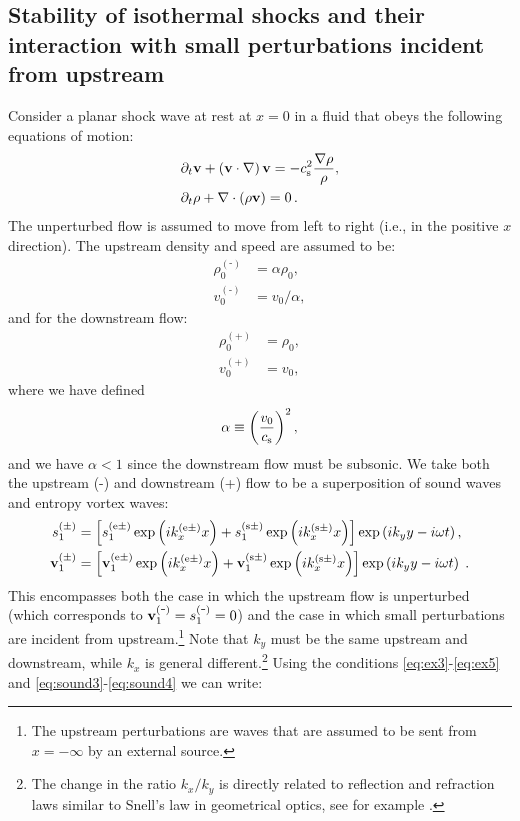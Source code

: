 \documentclass[useAMS,usenatbib]{mn2e}
\def\Plus{\texttt{+}}
\def\Minus{\texttt{-}}
\def\pa{\partial}
\begin{document}
\subsection{Stability of isothermal shocks and their interaction with small perturbations incident from upstream}
Consider a planar shock wave at rest at $x=0$ in a fluid that obeys the following equations of motion:
%
\begin{align} 
	& \pa_t \bfv + \left( \bfv \cdot \nabla \right) \bfv  = - \cs^2 \frac{\nabla \rho}{\rho} \label{eq:eomdk1}, \\ 
	& \pa_t \rho + \nabla \cdot \left( \rho \bfv \right) = 0 \, . \label{eq:eomdk2}
\end{align}
%
The unperturbed flow is assumed to move from left to right (i.e., in the positive $x$ direction). The upstream density and speed are assumed to be:
\begin{align}
\rho_0^{(\Minus)}& = \alpha \rho_0, \\
v_0^{(\Minus)}& =  v_0/\alpha,
\end{align}
and for the downstream flow:
\begin{align}
\rho_0^{(\Plus)} &= \rho_0, \\
v_0^{(\Plus)} &= v_0,
\end{align}
where we have defined 
\begin{equation}
\alpha \equiv \left( \frac{v_0}{c_{\rm s}}\right)^2,
\end{equation}
and we have $\alpha<1$ since the downstream flow must be subsonic.
%
We take both the upstream (-) and downstream (+) flow to be a superposition of sound waves and entropy vortex waves:
\begin{align}
s_1^{(\pm)} & = \left[ s_1 ^{(\rm e \pm)} \exp\left( i k_x^{(\rm e \pm) } x\right)  + s_1 ^{(\rm s \pm)}  \exp\left( i k_x^{(\rm s \pm)  } x \right)  \right] \exp\left(ik_y y - i \omega t \right) , \\ 
\mathbf{v}_1^{(\pm)} & = \left[ \mathbf{v}_1 ^{(\rm e \pm)} \exp\left( i k_x^{(\rm e \pm) } x\right)  + \mathbf{v}_1 ^{(\rm s \pm)}  \exp\left( i k_x^{(\rm s \pm)  } x \right)  \right] \exp\left(ik_y y - i \omega t \right)\;.
\end{align}
This encompasses both the case in which the upstream flow is unperturbed (which corresponds to $\bfv_1^{(\Minus)} = s_1^{(\Minus)}=0$) and the case in which small perturbations are incident from upstream.\footnote{The upstream perturbations are waves that are assumed to be sent from $x=-\infty$ by an external source.} Note that $k_y$ must be the same upstream and downstream, while $k_x$ is general different.\footnote{The change in the ratio $k_x/k_y$ is directly related to reflection and refraction laws similar to Snell's law in geometrical optics, see for example \cite{McKenzieWestphal1968}.} Using the conditions \eqref{eq:ex3}-\eqref{eq:ex5} and \eqref{eq:sound3}-\eqref{eq:sound4} we can write:
\end{document}
